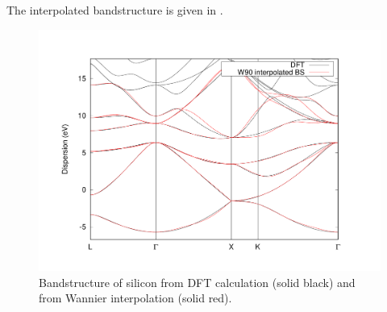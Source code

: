 \begin{itemize}
The interpolated bandstructure is given in .
\begin{figure}[h!]
\centering
\includegraphics[width=0.7\columnwidth]{figure/example11/silicon_bandstructure.pdf}
\caption{Bandstructure of silicon from DFT calculation (solid black) and from Wannier interpolation (solid red).}\label{fig11.3}
\end{figure}
\end{itemize}

